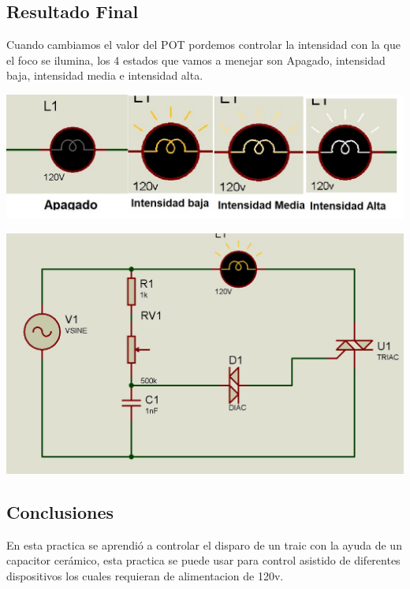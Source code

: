 \documentclass[12pt,a4paper]{article}
\begin{document}
\subsection{Resultado Final}
\begin{flushleft}
Cuando cambiamos el valor del POT pordemos controlar la intensidad con la que el foco se ilumina, los 4 estados que vamos a menejar son Apagado, intensidad baja, intensidad media e intensidad alta.\linebreak

\includegraphics[scale=0.5]{imagenes/Lamp.JPG}
\linebreak
\linebreak
\end{flushleft}
\begin{center}
\includegraphics[scale=0.4]{imagenes/circuito1.JPG}
\end{center}
\subsection{Conclusiones}
\begin{flushleft}
En esta practica se aprendió a controlar el disparo de un traic con la ayuda de un capacitor cerámico, esta practica se puede usar para control asistido de diferentes dispositivos los cuales requieran de alimentacion de 120v.
\end{flushleft}
\end{document}
